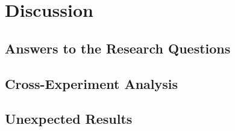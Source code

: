 %
%

\section{Discussion}
\label{sec:discussion}


\subsection{Answers to the Research Questions}
\label{sec:discussion-rq}

\subsection{Cross-Experiment Analysis}
\label{sec:discussion-cross}

\subsection{Unexpected Results}
\label{sec:discussion-unexpected}

